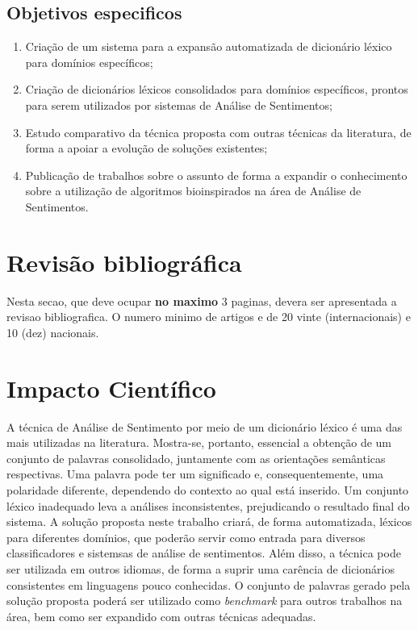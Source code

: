 \documentclass[a4paper,11pt]{article}
\begin{document}
\subsection{Objetivos especificos}

\begin{enumerate}
\item Criação de um sistema para a expansão automatizada de dicionário léxico para domínios específicos;
\item Criação de dicionários léxicos consolidados para domínios específicos, prontos para serem utilizados por sistemas de Análise de Sentimentos;
\item Estudo comparativo da técnica proposta com outras técnicas da literatura, de forma a apoiar a evolução de soluções existentes;
\item Publicação de trabalhos sobre o assunto de forma a expandir o conhecimento sobre a utilização de algoritmos bioinspirados na área de Análise de Sentimentos.

\end{enumerate}

\section{Revisão bibliográfica}
\label{sec:bibl}
Nesta secao, que deve ocupar \textbf{no maximo} 3 paginas, devera ser apresentada a revisao bibliografica. O numero minimo de artigos e de 20 vinte (internacionais) e 10 (dez) nacionais.

\section{Impacto Científico}
\label{sec:impact}
A técnica de Análise de Sentimento por meio de um dicionário léxico é uma das mais utilizadas na literatura. Mostra-se, portanto, essencial a obtenção de um conjunto de palavras consolidado, juntamente com as orientações semânticas respectivas. 
Uma palavra pode ter um significado e, consequentemente, uma polaridade diferente, dependendo do contexto ao qual está inserido. 
Um conjunto léxico inadequado leva a análises inconsistentes, prejudicando o resultado final do sistema.
A solução proposta neste trabalho criará, de forma automatizada, léxicos para diferentes domínios, que poderão servir como entrada para diversos classificadores e sistemsas de análise de sentimentos. Além disso, a técnica pode ser utilizada em outros idiomas, de forma a suprir uma carência de dicionários consistentes em linguagens pouco conhecidas.
O conjunto de palavras gerado pela solução proposta poderá ser utilizado como \emph{benchmark} para outros trabalhos na área, bem como ser expandido com outras técnicas adequadas.
\end{document}
